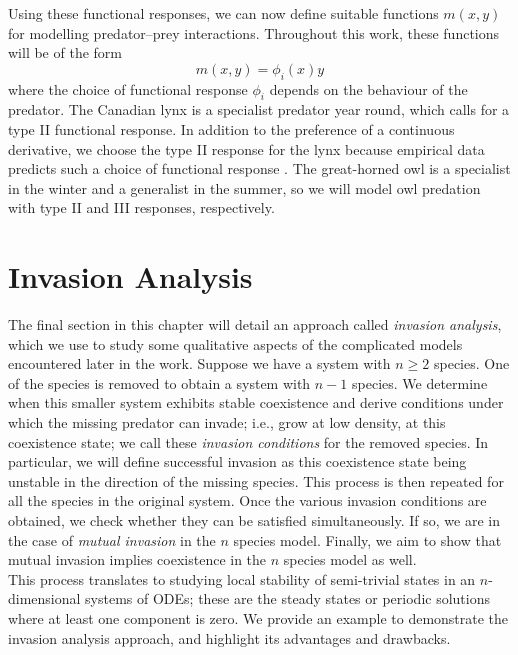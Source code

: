 \documentclass[12pt]{UOthesis}
\theoremstyle{remarkstyle}
\begin{document}
Using these functional responses, we can now define suitable functions $m(x,y)$ for modelling predator--prey interactions. Throughout this work, these functions will be of the form
	$$m(x,y)=\phi_i(x)y$$
where the choice of functional response $\phi_i$ depends on the behaviour of the predator. The Canadian lynx is a specialist predator year round, which calls for a type II functional response. In addition to the preference of a continuous derivative, we choose the type II response for the lynx because empirical data predicts such a choice of functional response \cite{VitenseEtAl}. The great-horned owl is a specialist in the winter and a generalist in the summer, so we will model owl predation with type II and III responses, respectively.

\section{Invasion Analysis}
\label{SectionInvAnalysis}

The final section in this chapter will detail an approach called \textit{invasion analysis}, which we use to study some qualitative aspects of the complicated models encountered later in the work. Suppose we have a system with $n\ge 2$ species. One of the species is removed to obtain a system with $n-1$ species. We determine when this smaller system exhibits stable coexistence and derive conditions under which the missing predator can invade; i.e., grow at low density, at this coexistence state; we call these \textit{invasion conditions} for the removed species. In particular, we will define successful invasion  as this coexistence state being unstable in the direction of the missing species. This process is then repeated for all the species in the original system. Once the various invasion conditions are obtained, we check whether they can be satisfied simultaneously. If so, we are in the case of \textit{mutual invasion} in the $n$ species model. Finally, we aim to show that mutual invasion implies coexistence in the $n$ species model as well.\\

This process translates to studying local stability of semi-trivial states in an $n$-dimensional systems of ODEs; these are the steady states or periodic solutions where at least one component is zero. We provide an example to demonstrate the invasion analysis approach, and highlight its advantages and drawbacks.\\
\end{document}
